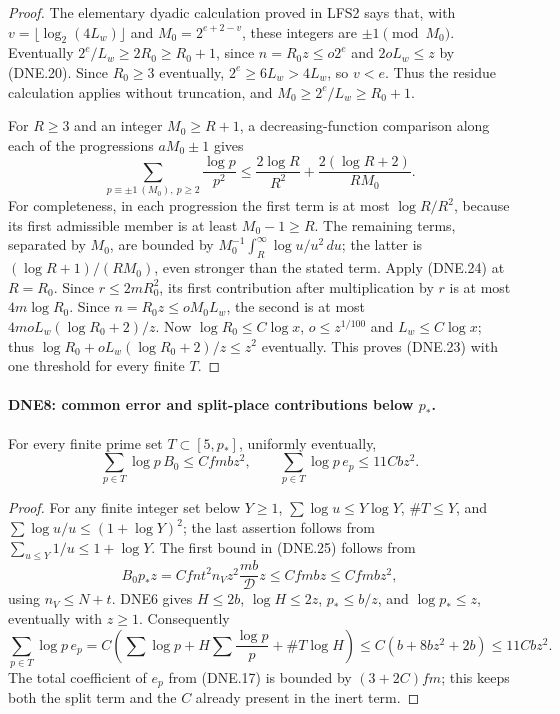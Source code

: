 \documentclass[11pt,a4paper]{article}
\numberwithin{equation}{section}
\theoremstyle{remark}\newtheorem{remark}[theorem]{Remark}
\begin{document}
\begin{proof}
The elementary dyadic calculation proved in LFS2 says that, with
$v=\lfloor\log_2(4L_w)\rfloor$ and
$M_0=2^{e+2-v}$, these integers are $\pm1\pmod{M_0}$.
Eventually $2^e/L_w\ge2R_0\ge R_0+1$, since
$n=R_0z\le o2^e$ and $2oL_w\le z$ by (DNE.20).
Since $R_0\ge3$ eventually, $2^e\ge6L_w>4L_w$,
so $v<e$.  Thus the residue calculation applies without truncation, and
$M_0\ge2^e/L_w\ge R_0+1$.

For $R\ge3$ and an integer $M_0\ge R+1$, a decreasing-function
comparison along each of the progressions $aM_0\pm1$ gives
\[
 \sum_{p\equiv\pm1\ (M_0),\ p\ge2}\frac{\log p}{p^2}
 \le\frac{2\log R}{R^2}
             +\frac{2(\log R+2)}{RM_0}.                 \tag{DNE.24}
\]
For completeness, in each progression the first term is at most
$\log R/R^2$, because its first admissible member is at least
$M_0-1\ge R$.  The remaining terms, separated by $M_0$, are
bounded by $M_0^{-1}\int_R^\infty\log u/u^2\,du$; the latter
is $(\log R+1)/(RM_0)$, even stronger than the stated term.
Apply (DNE.24) at $R=R_0$.  Since $r\le2mR_0^2$, its first
contribution after multiplication by $r$ is at most $4m\log R_0$.
Since $n=R_0z\le oM_0L_w$, the second is at most
$4moL_w(\log R_0+2)/z$.
Now $\log R_0\le C\log x$, $o\le z^{1/100}$ and
$L_w\le C\log x$; thus
$\log R_0+oL_w(\log R_0+2)/z\le z^2$ eventually.
This proves (DNE.23) with one threshold for every finite $T$.
\end{proof}

\paragraph{DNE8: common error and split-place contributions below $p_*$.}
\label{claim:DNE8}
For every finite prime set $T\subset[5,p_*]$, uniformly eventually,
\[
 \sum_{p\in T}\log p\,B_0\le Cfm bz^2,
 \qquad \sum_{p\in T}\log p\,e_p\le11Cbz^2.             \tag{DNE.25}
\]

\begin{proof}
For any finite integer set below $Y\ge1$,
$\sum\log u\le Y\log Y$, $\#T\le Y$, and
$\sum\log u/u\le(1+\log Y)^2$; the last assertion follows from
$\sum_{u\le Y}1/u\le1+\log Y$.
The first bound in (DNE.25) follows from
\[
 B_0p_*z=Cfnt^2n_Vz^2\frac{mb}{\mathcal D}z
      \le Cfm bz\le Cfm bz^2,
\]
using $n_V\le N+t$.  DNE6 gives $H\le2b$, $\log H\le2z$,
$p_*\le b/z$, and $\log p_*\le z$, eventually with $z\ge1$.
Consequently
\[
 \sum_{p\in T}\log p\,e_p
 =C\left(\sum\log p+H\sum\frac{\log p}{p}
                                     +\#T\log H\right)
 \le C(b+8bz^2+2b)\le11Cbz^2.
\]
The total coefficient of $e_p$ from (DNE.17) is bounded by
$(3+2C)fm$; this keeps both the split term and the $C$ already
present in the inert term.
\end{proof}
\end{document}
